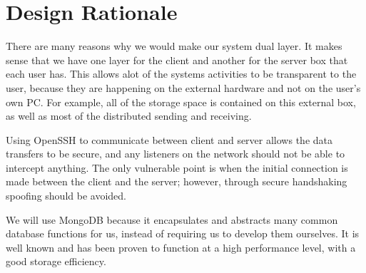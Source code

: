 \chapter{Design Rationale}
	There are many reasons why we would make our system dual layer.  It makes sense that we have one layer for the client and another for the server box that each user has.  This allows alot of the systems activities to be transparent to the user, because they are happening on the external hardware and not on the user's own PC.  For example, all of the storage space is contained on this external box, as well as most of the distributed sending and receiving.

	Using OpenSSH to communicate between client and server allows the data transfers to be secure, and any listeners on the network should not be able to intercept anything.  The only vulnerable point is when the initial connection is made between the client and the server; however, through secure handshaking spoofing should be avoided.

	We will use MongoDB because it encapsulates and abstracts many common database functions for us, instead of requiring us to develop them ourselves.  It is well known and has been proven to function at a high performance level, with a good storage efficiency.